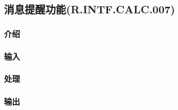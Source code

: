 \subsection{消息提醒功能(R.INTF.CALC.007)}
\subsubsection{介绍}
\subsubsection{输入}
\subsubsection{处理}
\subsubsection{输出}